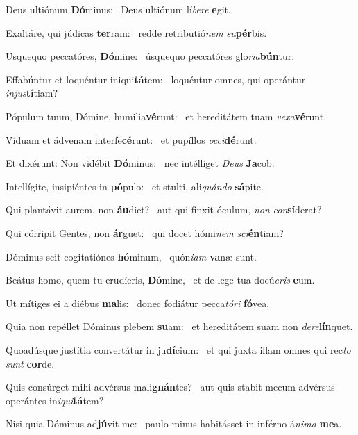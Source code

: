 \item Deus ultiónum \textbf{Dó}minus:~\psstar{} Deus ultiónum lí\textit{bere} \textbf{e}git.
\item Exaltáre, qui júdicas \textbf{ter}ram:~\psstar{} redde retributió\textit{nem} \textit{su}\textbf{pér}bis.
\item Usquequo peccatóres, \textbf{Dó}mine:~\psstar{} úsquequo peccatóres glo\textit{ria}\textbf{bún}tur:
\item Effabúntur et loquéntur iniqui\textbf{tá}tem:~\psstar{} loquéntur omnes, qui operántur \textit{injus}\textbf{tí}tiam?
\item Pópulum tuum, Dómine, humilia\textbf{vé}runt:~\psstar{} et hereditátem tuam \textit{vexa}\textbf{vé}runt.
\item Víduam et ádvenam interfe\-\textbf{cé}runt:~\psstar{} et pupíllos \textit{occi}\textbf{dé}runt.
\item Et dixérunt: Non vidébit \textbf{Dó}minus:~\psstar{} nec intélliget \textit{Deus} \textbf{Ja}cob.
\item Intellígite, insipiéntes in \textbf{pó}pulo:~\psstar{} et stulti, ali\textit{quándo} \textbf{sá}pite.
\item Qui plantávit aurem, non \textbf{áu}diet?~\psstar{} aut qui finxit óculum, \textit{non} \textit{con}\textbf{sí}derat?
\item Qui córripit Gentes, non \textbf{ár}guet:~\psstar{} qui docet hómi\textit{nem} \textit{sci}\textbf{én}tiam?
\item Dóminus scit cogitatiónes \textbf{hó}minum,~\psstar{} quón\textit{iam} \textbf{va}næ sunt.
\item Beátus homo, quem tu erudíeris, \textbf{Dó}mine,~\psstar{} et de lege tua docú\textit{eris} \textbf{e}um.
\item Ut mítiges ei a diébus \textbf{ma}lis:~\psstar{} donec fodiátur pecca\textit{tóri} \textbf{fó}vea.
\item Quia non repéllet Dóminus plebem \textbf{su}am:~\psstar{} et hereditátem suam non \textit{dere}\textbf{lín}quet.
\item Quoadúsque justítia convertátur in ju\textbf{dí}cium:~\psstar{} et qui juxta illam omnes qui rec\textit{to} \textit{sunt} \textbf{cor}de.
\item Quis consúrget mihi advérsus mali\textbf{gnán}tes?~\psstar{} aut quis stabit mecum advérsus operántes in\textit{iqui}\textbf{tá}tem?
\item Nisi quia Dóminus ad\textbf{jú}vit me:~\psstar{} paulo minus habitásset in inférno á\textit{nima} \textbf{me}a.
